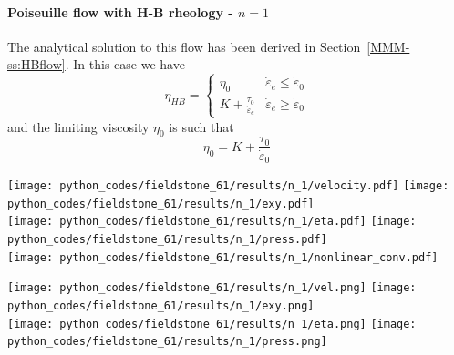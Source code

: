 \paragraph{Poiseuille flow with H-B rheology - $n=1$} 
The analytical solution to this flow has been derived in Section~\ref{MMM-ss:HBflow}.
In this case we have 
\[
\eta_{HB}
=
\left\{
\begin{array}{lc}
\eta_0 & \dot{\varepsilon}_e\leq \dot{\varepsilon}_0 \\
K  + \frac{\tau_0}{\dot{\varepsilon}_e}  
& \dot{\varepsilon}_e\geq \dot{\varepsilon}_0 
\end{array}
\right.
\]
and the limiting viscosity $\eta_0$ is such that 
\[
\eta_0 = K  + \frac{\tau_0}{\dot{\varepsilon}_0}  
\]

\begin{center}
\texttt{[image: python\_codes/fieldstone\_61/results/n\_1/velocity.pdf]}
\texttt{[image: python\_codes/fieldstone\_61/results/n\_1/exy.pdf]}\\
\texttt{[image: python\_codes/fieldstone\_61/results/n\_1/eta.pdf]}
\texttt{[image: python\_codes/fieldstone\_61/results/n\_1/press.pdf]}\\
\texttt{[image: python\_codes/fieldstone\_61/results/n\_1/nonlinear\_conv.pdf]}
\end{center}

\begin{center}
\texttt{[image: python\_codes/fieldstone\_61/results/n\_1/vel.png]}
\texttt{[image: python\_codes/fieldstone\_61/results/n\_1/exy.png]}\\
\texttt{[image: python\_codes/fieldstone\_61/results/n\_1/eta.png]}
\texttt{[image: python\_codes/fieldstone\_61/results/n\_1/press.png]}
\end{center}






